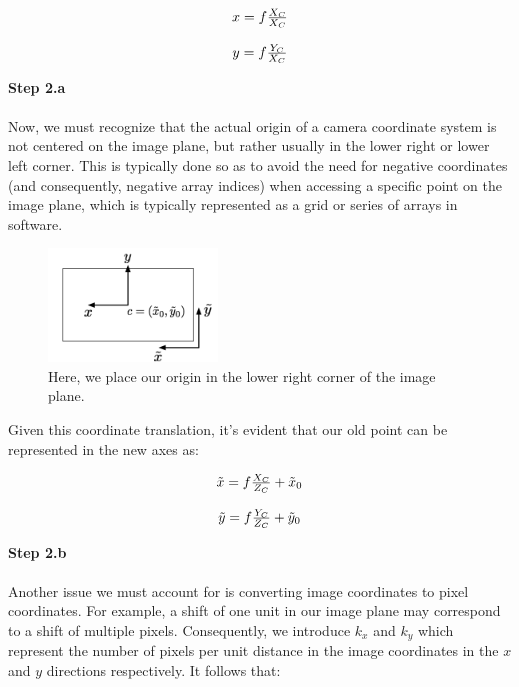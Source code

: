 \documentclass[]{article}
\begin{document}
\begin{center}
\begin{equation}
\begin{tabular}{c}
  $x = f\frac{X_C}{X_C}$\\
  \\
  $y = f\frac{Y_C}{X_C}$
\end{tabular}
\end{equation}
\end{center}

\textbf{Step 2.a}\\\\
Now, we must recognize that the actual origin of a camera coordinate system is not centered on the image plane, but rather usually in the lower right or lower left corner. This is typically done so as to avoid the need for negative coordinates (and consequently, negative array indices) when accessing a specific point on the image plane, which is typically represented as a grid or series of arrays in software.

\begin{figure}[H]
\includegraphics[width=0.4\textwidth]{vik_image_2.png}
\centering
\caption{Here, we place our origin in the lower right corner of the image plane. }
\label{fig:camera_coordinates}
\end{figure}

Given this coordinate translation, it's evident that our old point can be represented in the new axes as:

\begin{center}
\begin{equation}
\begin{tabular}{c}
  $\tilde{x} = f\frac{X_C}{Z_C} + \tilde{x}_0$\\
  \\
  $\tilde{y} = f\frac{Y_C}{Z_C} + \tilde{y}_0$
\end{tabular}
\end{equation}
\end{center}

\textbf{Step 2.b}\\\\
Another issue we must account for is converting image coordinates to pixel coordinates. For example, a shift of one unit in our image plane may correspond to a shift of multiple pixels. Consequently, we introduce $k_x$ and $k_y$ which represent the number of pixels per unit distance in the image coordinates in the $x$ and $y$ directions respectively. It follows that:
\end{document}
